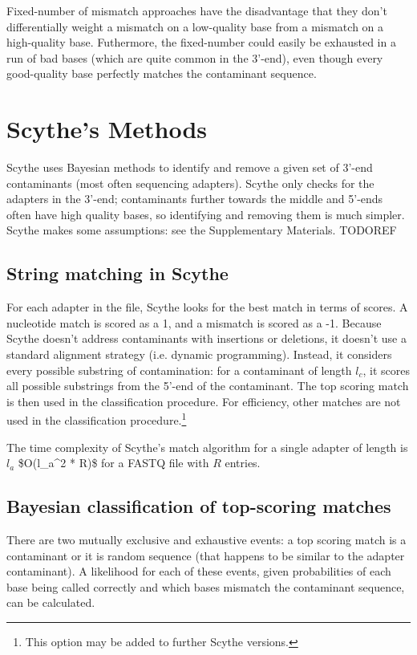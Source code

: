 \documentclass[11pt]{article}
\begin{document}
Fixed-number of mismatch approaches have the disadvantage that they
don't differentially weight a mismatch on a low-quality base from a
mismatch on a high-quality base. Futhermore, the fixed-number could
easily be exhausted in a run of bad bases (which are quite common in
the 3'-end), even though every good-quality base perfectly matches the
contaminant sequence.
\section{Scythe's Methods}
\label{sec-2}


Scythe uses Bayesian methods to identify and remove a given set of
3'-end contaminants (most often sequencing adapters). Scythe only
checks for the adapters in the 3'-end; contaminants further towards
the middle and 5'-ends often have high quality bases, so identifying
and removing them is much simpler. Scythe makes some assumptions: see
the Supplementary Materials. TODOREF
\subsection{String matching in Scythe}
\label{sec-2-1}


For each adapter in the file, Scythe looks for the best match in
terms of scores. A nucleotide match is scored as a 1, and a mismatch
is scored as a -1. Because Scythe doesn't address contaminants with
insertions or deletions, it doesn't use a standard alignment strategy
(i.e. dynamic programming). Instead, it considers every possible
substring of contamination: for a contaminant of length $l_c$, it
scores all possible substrings from the 5'-end of the contaminant. The
top scoring match is then used in the classification procedure. For
efficiency, other matches are not used in the classification
procedure.\footnote{This option may be added to further Scythe versions.
 }

The time complexity of Scythe's match algorithm for a single adapter
of length is $l_a$ \$O(l\_{}a\^{}2 * R)\$ for a FASTQ file with $R$ entries.
\subsection{Bayesian classification of top-scoring matches}
\label{sec-2-2}


There are two mutually exclusive and exhaustive events: a top scoring
match is a contaminant or it is random sequence (that happens to be
similar to the adapter contaminant). A likelihood for each of these
events, given probabilities of each base being called correctly and
which bases mismatch the contaminant sequence, can be calculated.
\end{document}

